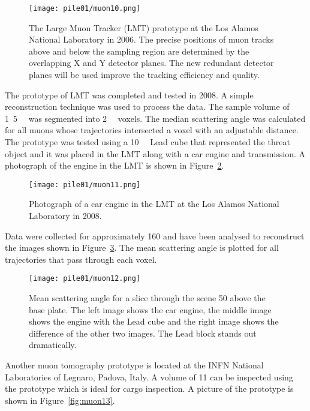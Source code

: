 \documentclass[twoside,titlepage,11pt,twocolumn,a4paper]{article}
\begin{document}
\begin{figure}
  \texttt{[image: pile01/muon10.png]}
  \caption{The Large Muon Tracker (LMT) prototype at the Los Alamos
    National Laboratory in 2006.  The precise positions of muon tracks
    above and below the sampling region are determined by the
    overlapping X and Y detector planes. The new redundant detector
    planes will be used improve the tracking efficiency and
    quality. \citep{green2006}}
  \label{fig:muon10}
\end{figure}

The prototype of LMT was completed and tested in 2008. A simple
reconstruction technique was used to process the data. The sample
volume of \unit{1.5}{\cubic\metre} was segmented
into \unit{2}{\cubic{\centi\metre}} voxels. The median
scattering angle was calculated for all muons whose trajectories
intersected a voxel with an adjustable distance. The prototype was
tested using a \unit{10}{\cubic{\centi\metre}} Lead
cube that represented the threat object and it was placed in the LMT
along with a car engine and transmission.  A photograph of the engine
in the LMT is shown in Figure~\ref{fig:muon11}. \citep{morris2008}

\begin{figure}
  \texttt{[image: pile01/muon11.png]}
  \caption{Photograph of a car engine in the LMT at the Los Alamos
    National Laboratory in 2008. \citep{morris2008}}
  \label{fig:muon11}
\end{figure}

Data were collected for approximately \unit{160}{\minute} and have
been analysed to reconstruct the images shown in
Figure~\ref{fig:muon12}. The mean scattering angle is plotted for all
trajectories that pass through each voxel. \citep{morris2008}

\begin{figure}
  \texttt{[image: pile01/muon12.png]}
  \caption{Mean scattering angle for a slice through the scene
    \unit{50}{\centi\metre} above the base plate. The left image shows
    the car engine, the middle image shows the engine with the Lead
    cube and the right image shows the difference of the other two
    images. The Lead block stands out dramatically. \citep{morris2008}}
  \label{fig:muon12}
\end{figure}

Another muon tomography prototype is located at the INFN National
Laboratories of Legnaro, Padova, Italy. A volume of
\unit{11}{\cubic\metre} can be inspected using the prototype which is
ideal for cargo inspection. A picture of the prototype is shown in
Figure~\ref{fig:muon13}. \citep{pesente2009}
\end{document}
